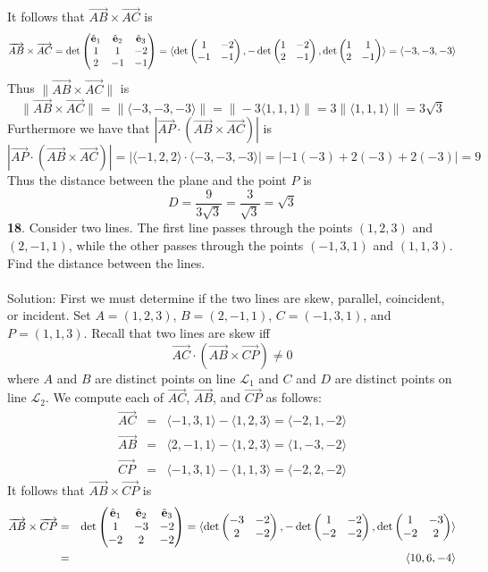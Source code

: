 \documentclass[12pt]{amsbook}
\newcommand{\la}{\langle}
\newcommand{\ra}{\rangle}
\begin{document}
It follows that $\overrightarrow{AB}\times\overrightarrow{AC}$ is 
$$\overrightarrow{AB}\times\overrightarrow{AC}=\det
\begin{pmatrix}
\hat{\bf e}_1 & \hat{\bf e}_2 & \hat{\bf e}_3\cr 1&1&-2\cr 2&-1&-1 \end{pmatrix}=\la \det\begin{pmatrix}1&-2\cr -1&-1  \end{pmatrix}, -\det\begin{pmatrix}1&-2\cr 2&-1  \end{pmatrix}, \det\begin{pmatrix}1&1\cr 2&-1 \end{pmatrix} \ra = \la -3,-3,-3 \ra$$
Thus $\|\overrightarrow{AB}\times\overrightarrow{AC}\|$ is
$$\|\overrightarrow{AB}\times\overrightarrow{AC}\|=\|\la -3,-3,-3 \ra\|=\|-3\la 1,1,1 \ra\|=3\|\la 1,1,1 \ra\|=3\sqrt{3}$$
Furthermore we have that $|\overrightarrow{AP}\cdot(\overrightarrow{AB}\times\overrightarrow{AC})|$ is
$$|\overrightarrow{AP}\cdot(\overrightarrow{AB}\times\overrightarrow{AC})|=|\la -1,2,2 \ra \cdot \la -3,-3,-3 \ra |=|-1(-3)+2(-3)+2(-3)|=9$$
Thus the distance between the plane and the point $P$ is 
$$D=\frac{9}{3\sqrt{3}}=\frac{3}{\sqrt{3}}=\sqrt{3}$$
{\small\bf 18}. Consider two lines. The first line passes through the
points $(1,2,3)$ and $(2,-1,1)$, while the other passes through
the points $(-1,3,1)$ and $(1,1,3)$. Find the distance between the
lines.\\
\\
{\sc Solution}: First we must determine if the two lines are skew, parallel, coincident, or incident. Set $A=(1,2,3)$, $B=(2,-1,1)$, $C=(-1,3,1)$, and $P=(1,1,3)$. Recall that two lines are skew iff
$$\overrightarrow{AC}\cdot(\overrightarrow{AB}\times\overrightarrow{CP})\neq 0$$
where $A$ and $B$ are distinct points on line $\mathcal{L}_1$ and $C$ and $D$ are distinct points on line $\mathcal{L}_2$. We compute each of $\overrightarrow{AC}$, $\overrightarrow{AB}$, and $\overrightarrow{CP}$ as follows:
\begin{eqnarray*}
\overrightarrow{AC}&=&\la -1,3,1 \ra - \la 1,2,3 \ra = \la -2,1,-2 \ra \\
\overrightarrow{AB}&=&\la 2,-1,1 \ra - \la 1,2,3 \ra = \la 1,-3,-2 \ra \\
\overrightarrow{CP}&=&\la -1,3,1 \ra - \la 1,1,3 \ra = \la -2,2,-2 \ra
\end{eqnarray*}
It follows that $\overrightarrow{AB}\times\overrightarrow{CP}$ is 
\begin{eqnarray*}
\overrightarrow{AB}\times\overrightarrow{CP}&=&\det
\begin{pmatrix}
\hat{\bf e}_1 & \hat{\bf e}_2 & \hat{\bf e}_3\cr 1&-3&-2\cr -2&2&-2 \end{pmatrix}=\la \det\begin{pmatrix}-3&-2\cr 2&-2  \end{pmatrix}, -\det\begin{pmatrix}1&-2\cr -2&-2  \end{pmatrix}, \det\begin{pmatrix}1&-3\cr -2&2 \end{pmatrix} \ra \\
&=& \la 10,6,-4 \ra
\end{eqnarray*}
\end{document}
